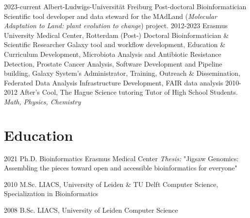 \documentclass[]{shiltemann-cv}
\begin{document}
\begin{entrylist}
 \entry
    {2023-current}
    {Albert-Ludwigs-Universität Freiburg}
    {Post-doctoral Bioinformatician}
    {Scientific tool developer and data steward for the MAdLand (\emph{Molecular Adaptation to Land: plant evolution to change}) project.}
 \entry
    {2012-2023}
    {Erasmus University Medical Center, Rotterdam}
    {(Post-) Doctoral Bioinformatician \& Scientific Researcher}
    {Galaxy tool and workflow development, Education \& Curriculum Development, Microbiota Analysis and Antibiotic Resistance Detection, Prostate Cancer Analysis, Software Development and Pipeline building, Galaxy System's Administrator, Training, Outreach \& Dissemination, Federated Data Analysis Infrastructure Development, FAIR data analysis}
  \entry
    {2010-2012}
    {After's Cool, The Hague}
    {Science tutoring}
    {Tutor of High School Students. \emph{Math, Physics, Chemistry}}
\end{entrylist}


\section{Education}

\begin{entrylist}
  \entry
    {2021}
    {Ph.D. Bioinformatics}
    {Erasmus Medical Center}
    {\emph{Thesis:} "Jigsaw Genomics: Assembling the pieces toward open and accessible bioinformatics for everyone"}
\end{entrylist}
\begin{entrylist}


  \entry
    {2010}
    {M.Sc.}
    {LIACS, University of Leiden \& TU Delft}
    {Computer Science, Specialization in Bioinformatics}

\end{entrylist}
\begin{entrylist}

  \entry
    {2008}
    {B.Sc.}
    {LIACS, University of Leiden}
    {Computer Science}
\end{entrylist}
\end{document}
